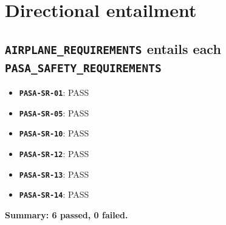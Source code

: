 \documentclass[11pt,a4paper]{article}
\begin{document}
\section{Directional entailment}
\subsection*{\texttt{AIRPLANE\_REQUIREMENTS} entails each \texttt{PASA\_SAFETY\_REQUIREMENTS}}
\begin{itemize}
\item \textbf{\texttt{PASA-SR-01}}: PASS
\item \textbf{\texttt{PASA-SR-05}}: PASS
\item \textbf{\texttt{PASA-SR-10}}: PASS
\item \textbf{\texttt{PASA-SR-12}}: PASS
\item \textbf{\texttt{PASA-SR-13}}: PASS
\item \textbf{\texttt{PASA-SR-14}}: PASS
\end{itemize}
\textbf{Summary: 6 passed, 0 failed.}
\end{document}
